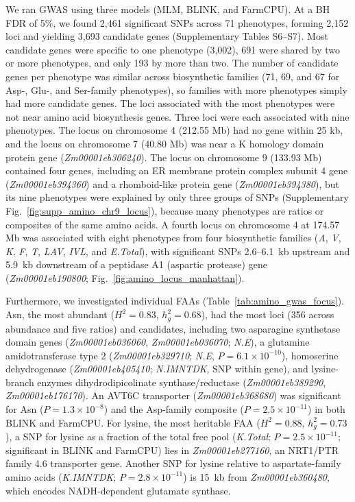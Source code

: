 We ran GWAS using three models (MLM, BLINK, and FarmCPU). At a BH FDR of 5\%, we found 2,461 significant SNPs across 71 phenotypes, forming 2,152 loci and yielding 3,693 candidate genes (Supplementary Tables S6--S7). Most candidate genes were specific to one phenotype (3,002), 691 were shared by two or more phenotypes, and only 193 by more than two. The number of candidate genes per phenotype was similar across biosynthetic families (71, 69, and 67 for Asp-, Glu-, and Ser-family phenotypes), so families with more phenotypes simply had more candidate genes. The loci associated with the most phenotypes were not near amino acid biosynthesis genes. Three loci were each associated with nine phenotypes. The locus on chromosome 4 (212.55 Mb) had no gene within 25 kb, and the locus on chromosome 7 (40.80 Mb) was near a K homology domain protein gene (\textit{Zm00001eb306240}). The locus on chromosome 9 (133.93 Mb) contained four genes, including an ER membrane protein complex subunit 4 gene (\textit{Zm00001eb394360}) and a rhomboid-like protein gene (\textit{Zm00001eb394380}), but its nine phenotypes were explained by only three groups of SNPs (Supplementary Fig.~\ref{fig:supp_amino_chr9_locus}), because many phenotypes are ratios or composites of the same amino acids. A fourth locus on chromosome 4 at 174.57 Mb was associated with eight phenotypes from four biosynthetic families (\textit{A}, \textit{V}, \textit{K}, \textit{F}, \textit{T}, \textit{LAV}, \textit{IVL}, and \textit{E.Total}), with significant SNPs 2.6--6.1~kb upstream and 5.9~kb downstream of a peptidase A1 (aspartic protease) gene (\textit{Zm00001eb190800}; Fig.~\ref{fig:amino_locus_manhattan}).

Furthermore, we investigated individual FAAs (Table~\ref{tab:amino_gwas_focus}). Asn, the most abundant ($H^2=0.83$, $h^2_g=0.68$), had the most loci (356 across abundance and five ratios) and candidates, including two asparagine synthetase domain genes (\textit{Zm00001eb036060}, \textit{Zm00001eb036070}; \textit{N.E}), a glutamine amidotransferase type 2 (\textit{Zm00001eb329710}; \textit{N.E}, $P=6.1\times10^{-10}$), homoserine dehydrogenase (\textit{Zm00001eb405410}; \textit{N.IMNTDK}, SNP within gene), and lysine-branch enzymes dihydrodipicolinate synthase/reductase (\textit{Zm00001eb389290}, \textit{Zm00001eb176170}). An AVT6C transporter (\textit{Zm00001eb368680}) was significant for Asn ($P=1.3\times10^{-8}$) and the Asp-family composite ($P=2.5\times10^{-11}$) in both BLINK and FarmCPU. For lysine, the most heritable FAA ($H^2 = 0.88$, $h^2_g = 0.73$), a SNP for lysine as a fraction of the total free pool (\textit{K.Total}; $P = 2.5 \times 10^{-11}$; significant in BLINK and FarmCPU) lies in \textit{Zm00001eb277160}, an NRT1/PTR family 4.6 transporter gene. Another SNP for lysine relative to aspartate-family amino acids (\textit{K.IMNTDK}; $P = 2.8 \times 10^{-11}$) is 15~kb from \textit{Zm00001eb360480}, which encodes NADH-dependent glutamate synthase.

